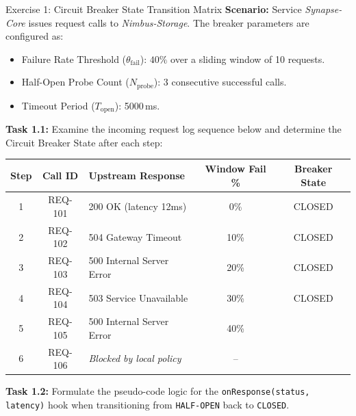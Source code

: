 \documentclass[11pt, a4paper, parskip=half]{scrartcl}
\begin{document}
\begin{exercisebox}[label=ex:circuit]{Exercise 1: Circuit Breaker State Transition Matrix}
\textbf{Scenario:} Service \textit{Synapse-Core} issues request calls to \textit{Nimbus-Storage}. The breaker parameters are configured as:
\begin{itemize}[leftmargin=14pt, itemsep=0pt]
    \item Failure Rate Threshold ($\theta_{\text{fail}}$): $40\%$ over a sliding window of 10 requests.
    \item Half-Open Probe Count ($N_{\text{probe}}$): 3 consecutive successful calls.
    \item Timeout Period ($T_{\text{open}}$): 5000\,ms.
\end{itemize}

\vspace{1pt}
\textbf{Task 1.1:} Examine the incoming request log sequence below and determine the Circuit Breaker State after each step:

\vspace{2pt}
\begin{center}
\small
\begin{tabularx}{\textwidth}{c c X c c}
\toprule
\textbf{Step} & \textbf{Call ID} & \textbf{Upstream Response} & \textbf{Window Fail \%} & \textbf{Breaker State} \\
\midrule
1 & REQ-101 & 200 OK (latency 12ms) & 0\% & CLOSED \\
2 & REQ-102 & 504 Gateway Timeout & 10\% & CLOSED \\
3 & REQ-103 & 500 Internal Server Error & 20\% & CLOSED \\
4 & REQ-104 & 503 Service Unavailable & 30\% & CLOSED \\
5 & REQ-105 & 500 Internal Server Error & 40\% & \underline{\hspace{3cm}} \\
6 & REQ-106 & \textit{Blocked by local policy} & -- & \underline{\hspace{3cm}} \\
\bottomrule
\end{tabularx}
\end{center}

\vspace{1pt}
\textbf{Task 1.2:} Formulate the pseudo-code logic for the \texttt{onResponse(status, latency)} hook when transitioning from \texttt{HALF-OPEN} back to \texttt{CLOSED}.


\end{exercisebox}
\end{document}
